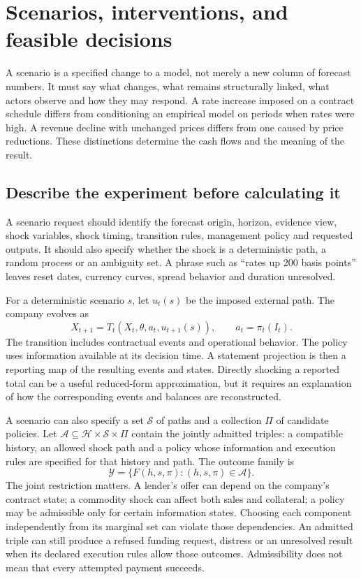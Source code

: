 \chapter[Scenarios and feasible decisions]{Scenarios, interventions, and feasible decisions}
\label{sim:scenarios}

A scenario is a specified change to a model, not merely a new column of forecast numbers. It must say what changes, what remains structurally linked, what actors observe and how they may respond. A rate increase imposed on a contract schedule differs from conditioning an empirical model on periods when rates were high. A revenue decline with unchanged prices differs from one caused by price reductions. These distinctions determine the cash flows and the meaning of the result.

\section{Describe the experiment before calculating it}
A scenario request should identify the forecast origin, horizon, evidence view, shock variables, shock timing, transition rules, management policy and requested outputs. It should also specify whether the shock is a deterministic path, a random process or an ambiguity set. A phrase such as ``rates up 200 basis points'' leaves reset dates, currency curves, spread behavior and duration unresolved.

For a deterministic scenario $s$, let $u_t(s)$ be the imposed external path. The company evolves as
\begin{equation}
 X_{t+1}=T_t(X_t,\theta,a_t,u_{t+1}(s)),\qquad a_t=\pi_t(I_t).
 \label{sim:scenario-transition}
\end{equation}
The transition includes contractual events and operational behavior. The policy uses information available at its decision time. A statement projection is then a reporting map of the resulting events and states. Directly shocking a reported total can be a useful reduced-form approximation, but it requires an explanation of how the corresponding events and balances are reconstructed.

A scenario can also specify a set $\mathcal S$ of paths and a collection
$\Pi$ of candidate policies. Let $\mathcal A\subseteq\mathcal H\times
\mathcal S\times\Pi$ contain the jointly admitted triples: a compatible
history, an allowed shock path and a policy whose information and execution
rules are specified for that history and path. The outcome family is
\begin{equation}
 \mathcal Y=\{F(h,s,\pi):(h,s,\pi)\in\mathcal A\}.
\end{equation}
The joint restriction matters. A lender's offer can depend on the company's
contract state; a commodity shock can affect both sales and collateral; a
policy may be admissible only for certain information states. Choosing each
component independently from its marginal set can violate those dependencies.
An admitted triple can still produce a refused funding request, distress or
an unresolved result when its declared execution rules allow those outcomes.
Admissibility does not mean that every attempted payment succeeds.

